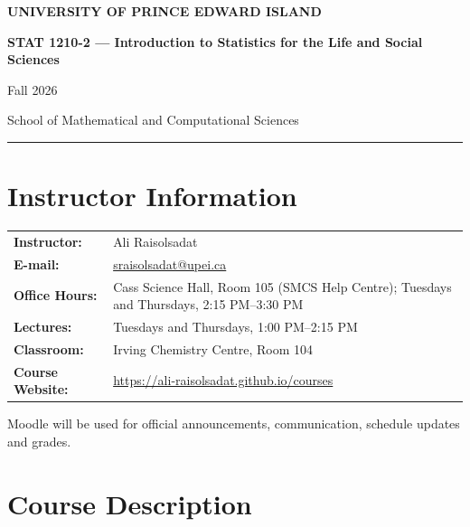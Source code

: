 \documentclass[10pt]{article}
\begin{document}

\begin{center}

{\Large\bfseries UNIVERSITY OF PRINCE EDWARD ISLAND}

\vspace{1mm}

{\large\bfseries STAT 1210-2 --- Introduction to Statistics for the Life and Social Sciences}

{\normalsize Fall 2026}

School of Mathematical and Computational Sciences

\end{center}

\vspace{2mm}

\hrule

\vspace{4mm}


\section{Instructor Information}

\begin{tabular}{@{}>{\bfseries}l l@{}}
Instructor: & Ali Raisolsadat \\
E-mail: & \href{mailto:sraisolsadat@upei.ca}{sraisolsadat@upei.ca} \\
Office Hours: & Cass Science Hall, Room 105 (SMCS Help Centre); Tuesdays and Thursdays, 2:15 PM--3:30 PM \\
Lectures: & Tuesdays and Thursdays, 1:00 PM--2:15 PM \\
Classroom: & Irving Chemistry Centre, Room 104 \\
Course Website: & \url{https://ali-raisolsadat.github.io/courses}
\end{tabular}

Moodle will be used for official announcements, communication, schedule
updates and grades.


\section{Course Description}
\end{document}
